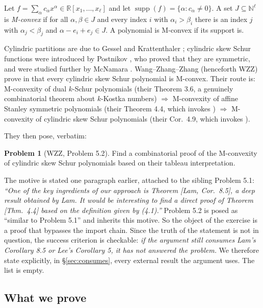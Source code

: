\documentclass[11pt]{article}
\theoremstyle{plain}
\theoremstyle{definition}
\newtheorem{prob}[thm]{Problem}
\DeclareMathOperator{\supp}{supp}
\newcommand{\N}{\mathbb{N}}
\begin{document}
Let $f=\sum_{\alpha}c_\alpha x^\alpha\in\mathbb{R}[x_1,\dots,x_\ell]$ and let
$\supp(f)=\{\alpha: c_\alpha\neq 0\}$. A set $J\subseteq \N^\ell$ is \emph{M-convex} if for all
$\alpha,\beta\in J$ and every index $i$ with $\alpha_i>\beta_i$ there is an index $j$ with
$\alpha_j<\beta_j$ and $\alpha-e_i+e_j\in J$. A polynomial is M-convex if its support is.

Cylindric partitions are due to Gessel and Krattenthaler \cite{GesKra}; cylindric skew Schur
functions were introduced by Postnikov \cite{Post}, who proved that they are symmetric, and
were studied further by McNamara \cite{McN}. Wang--Zhang--Zhang (henceforth
WZZ) prove in \cite[Cor.~4.9]{WZZ} that every cylindric skew Schur polynomial is M-convex.
Their route is: M-convexity of dual $k$-Schur polynomials (their Theorem 3.6, a genuinely
combinatorial theorem about $k$-Kostka numbers) $\Rightarrow$ M-convexity of affine Stanley
symmetric polynomials (their Theorem 4.4, which invokes \cite[Cor.~8.5]{Lam2008}) $\Rightarrow$
M-convexity of cylindric skew Schur polynomials (their Cor.~4.9, which invokes
\cite[Cor.~5]{Lee2019}).

They then pose, verbatim:

\begin{prob}[{WZZ, Problem 5.2}]
Find a combinatorial proof of the M-convexity of cylindric skew Schur polynomials based on
their tableau interpretation.
\end{prob}

The motive is stated one paragraph earlier, attached to the sibling Problem 5.1:
\emph{``One of the key ingredients of our approach is Theorem \textup{[Lam, Cor.~8.5]}, a deep
result obtained by Lam. It would be interesting to find a direct proof of Theorem
\textup{[Thm.~4.4]} based on the definition given by \textup{(4.1)}.''} Problem 5.2 is posed as
``similar to Problem 5.1'' and inherits this motive. So the object of the exercise is a proof
that bypasses the import chain. Since the truth of the statement is not in question, the
success criterion is checkable: \emph{if the argument still consumes Lam's Corollary 8.5 or
Lee's Corollary 5, it has not answered the problem.} We therefore state explicitly, in
\S\ref{sec:consumes}, every external result the argument uses. The list is empty.

\subsection{What we prove}
\end{document}
